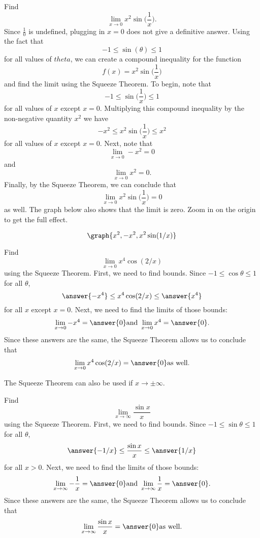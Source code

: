 \documentclass{ximera}
\begin{document}
\begin{example}
Find
\[
\lim_{x\to 0} x^2 \sin\Big(\frac{1}{x}\Big).
\]
Since $\frac{1}{0}$ is undefined, plugging in $x=0$
does not give a definitive answer.
Using the fact that 
\[
-1 \leq \sin(\theta) \leq 1
\]
for all values of $theta$, we can create a compound inequality for
the function
\[
f(x) = x^2 \sin\Big(\frac{1}{x}\Big)
\]
and find the limit using the Squeeze Theorem.
To begin, note that
\[
-1 \leq \sin\Big(\frac{1}{x}\Big) \leq 1
\]
for all values of $x$ except $x=0$.
Multiplying this compound inequality by the non-negative quantity $x^2$
we have
\[
-x^2 \leq x^2\sin\Big(\frac{1}{x}\Big) \leq x^2
\]
for all values of $x$ except $x=0$.
Next, note that
\[
\lim_{x\to 0} -x^2 = 0
\]
and
\[
\lim_{x\to 0} x^2 = 0.
\]
Finally, by the Squeeze Theorem, we can conclude that
\[
\lim_{x\to 0} x^2\sin\Big(\frac{1}{x}\Big) = 0
\]
as well. The graph below also shows that the limit is zero.
Zoom in on the origin to get the full effect.

\[
\graph{x^2, -x^2, x^2 \sin(1/x)}
\]

\end{example}

\begin{problem}
Find
\[
\lim_{x \to 0} x^4 \cos(2/x)
\]
using the Squeeze Theorem.
First, we need to find bounds. Since $-1 \leq \cos \theta \leq 1$ for all $\theta$, 
\[
\answer{-x^4} \leq x^4\cos(2/x) \leq \answer{x^4}
\]
for all $x$ except $x=0$.
Next, we need to find the limits of those bounds:
\[
\lim_{x \to 0}  - x^4 = \answer{0} \text{and    } \lim_{x \to 0} x^4 = \answer{0}.
\]
Since these answers are the same, the Squeeze Theorem allows us to conclude that 
\[
\lim_{x \to 0} x^4\cos(2/x) = \answer{0} \text{as well}.
\]

\end{problem}

The Squeeze Theorem can also be used if $x \to \pm \infty$.

\begin{problem}
Find
\[
\lim_{x \to \infty} \frac{\sin x}{x}
\]
using the Squeeze Theorem.
First, we need to find bounds. Since $-1 \leq \sin \theta \leq 1$ for all $\theta$, 
\[
\answer{-1/x} \leq \frac{\sin x}{x} \leq \answer{1/x}
\]
for all $x>0$.
Next, we need to find the limits of those bounds:
\[
\lim_{x \to \infty}  -\frac{1}{x} = \answer{0} \text{and    } \lim_{x \to \infty} \frac{1}{x} = \answer{0}.
\]
Since these answers are the same, the Squeeze Theorem allows us to conclude that 
\[
\lim_{x \to \infty} \frac{\sin x}{x} = \answer{0} \text{as well}.
\]

\end{problem}
\end{document}
